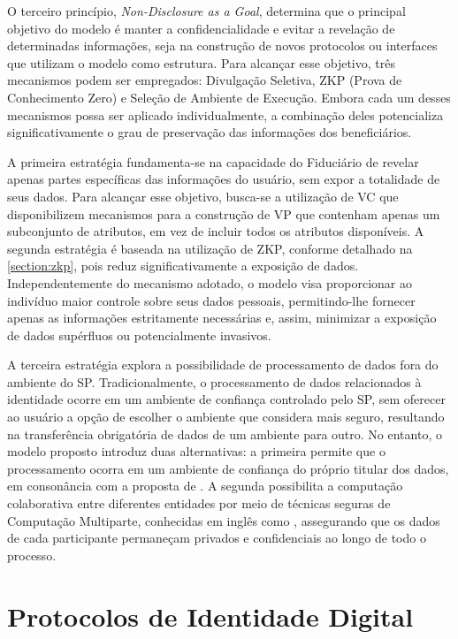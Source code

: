 O terceiro princípio, \emph{Non-Disclosure as a Goal}, determina que o principal objetivo do modelo é manter a confidencialidade e evitar a revelação de determinadas informações, seja na construção de novos protocolos ou interfaces que utilizam o modelo como estrutura. Para alcançar esse objetivo, três mecanismos podem ser empregados: Divulgação Seletiva, \acs{ZKP} (Prova de Conhecimento Zero) e Seleção de Ambiente de Execução. Embora cada um desses mecanismos possa ser aplicado individualmente, a combinação deles potencializa significativamente o grau de preservação das informações dos beneficiários.

A primeira estratégia fundamenta-se na capacidade do Fiduciário de revelar apenas partes específicas das informações do usuário, sem expor a totalidade de seus dados. Para alcançar esse objetivo, busca-se a utilização de \acs{VC} que disponibilizem mecanismos para a construção de \acs{VP} que contenham apenas um subconjunto de atributos, em vez de incluir todos os atributos disponíveis. A segunda estratégia é baseada na utilização de  \acs{ZKP}, conforme detalhado na \autoref{section:zkp}, pois reduz significativamente a exposição de dados. Independentemente do mecanismo adotado, o modelo visa proporcionar ao indivíduo maior controle sobre seus dados pessoais, permitindo-lhe fornecer apenas as informações estritamente necessárias e, assim, minimizar a exposição de dados supérfluos ou potencialmente invasivos.

A terceira estratégia explora a possibilidade de processamento de dados fora do ambiente do \acs{SP}. Tradicionalmente, o processamento de dados relacionados à identidade ocorre em um ambiente de confiança controlado pelo \acs{SP}, sem oferecer ao usuário a opção de escolher o ambiente que considera mais seguro, resultando na transferência obrigatória de dados de um ambiente para outro. No entanto, o modelo proposto introduz duas alternativas: a primeira permite que o processamento ocorra em um ambiente de confiança do próprio titular dos dados, em consonância com a proposta de . A segunda possibilita a computação colaborativa entre diferentes entidades por meio de técnicas seguras de Computação Multiparte, conhecidas em inglês como , assegurando que os dados de cada participante permaneçam privados e confidenciais ao longo de todo o processo. 




\section{Protocolos de Identidade Digital}\label{subsection:protocolos}

